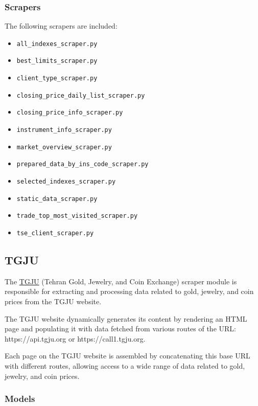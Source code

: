{	\subsubsection{Scrapers}

	The following scrapers are included:

	\begin{itemize}
	    \item \texttt{all\_indexes\_scraper.py}
	    \item \texttt{best\_limits\_scraper.py}
	    \item \texttt{client\_type\_scraper.py}
	    \item \texttt{closing\_price\_daily\_list\_scraper.py}
	    \item \texttt{closing\_price\_info\_scraper.py}
	    \item \texttt{instrument\_info\_scraper.py}
	    \item \texttt{market\_overview\_scraper.py}
	    \item \texttt{prepared\_data\_by\_ins\_code\_scraper.py}
	    \item \texttt{selected\_indexes\_scraper.py}
	    \item \texttt{static\_data\_scraper.py}
	    \item \texttt{trade\_top\_most\_visited\_scraper.py}
	    \item \texttt{tse\_client\_scraper.py}
	\end{itemize}



	\newpage
	\subsection{TGJU}
	The \hyperlink{https://www.tgju.org}{TGJU} (Tehran Gold, Jewelry, and Coin Exchange) scraper module is responsible for extracting and processing data related to gold, jewelry, and coin prices from the TGJU website.

	The TGJU website dynamically generates its content by rendering an HTML page and populating it with data fetched from various routes of the URL: https://api.tgju.org or https://call1.tgju.org.

	Each page on the TGJU website is assembled by concatenating this base URL with different routes, allowing access to a wide range of data related to gold, jewelry, and coin prices.

	\subsubsection{Models}

}
